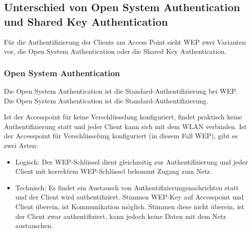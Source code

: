 \subsection{Unterschied von Open System Authentication und Shared Key Authentication}

Für die Authentifizierung der Clients am Access Point sieht WEP zwei Varianten vor, die Open System Authentication oder die Shared Key Authentication.

	\subsubsection{Open System Authentication}
	Die Open System Authentication ist die Standard-Authentifizierung bei WEP. Die Open System Authentication ist die Standard-Authentifizierung.

	Ist der Accesspoint für keine Verschlüsselung konfiguriert, findet praktisch keine Authentifizierung statt und jeder Client kann sich mit dem WLAN verbinden.
	Ist der Accesspoint für Verschlüsselung konfiguriert (in diesem Fall WEP), gibt es zwei Arten: \\
	\begin{itemize}
	\item Logisch: Der WEP-Schlüssel dient gleichzeitig zur Authentifizierung und jeder Client mit korrektem WEP-Schlüssel bekommt Zugang zum Netz.

	\item Technisch: Es findet ein Austausch von Authentifizierungsnachrichten statt und der Client wird authentifiziert. Stimmen WEP-Key auf Accesspoint und Client überein, ist Kommunikation möglich. Stimmen diese nicht überein, ist der Client zwar authentifiziert, kann jedoch keine Daten mit dem Netz austauschen. \\
	\end{itemize}

